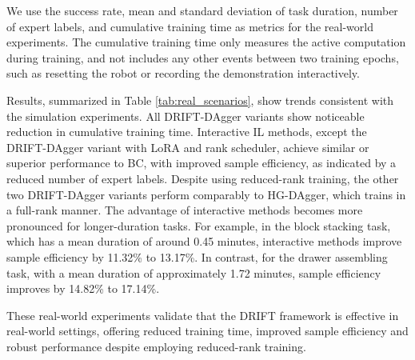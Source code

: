 We use the success rate, mean and standard deviation of task duration, number of expert labels, and cumulative training time as metrics for the real-world experiments. The cumulative training time only measures the active computation during training, and not includes any other events between two training epochs, such as resetting the robot or recording the demonstration interactively. 

Results, summarized in Table \ref{tab:real_scenarios}, show trends consistent with the simulation experiments. All DRIFT-DAgger variants show noticeable reduction in cumulative training time. Interactive IL methods, except the DRIFT-DAgger variant with LoRA and rank scheduler, achieve similar or superior performance to BC, with improved sample efficiency, as indicated by a reduced number of expert labels. Despite using reduced-rank training, the other two DRIFT-DAgger variants perform comparably to HG-DAgger, which trains in a full-rank manner. The advantage of interactive methods becomes more pronounced for longer-duration tasks. For example, in the block stacking task, which has a mean duration of around 0.45 minutes, interactive methods improve sample efficiency by 11.32\% to 13.17\%. In contrast, for the drawer assembling task, with a mean duration of approximately 1.72 minutes, sample efficiency improves by 14.82\% to 17.14\%.

These real-world experiments validate that the DRIFT framework is effective in real-world settings, offering reduced training time, improved sample efficiency and robust performance despite employing reduced-rank training.